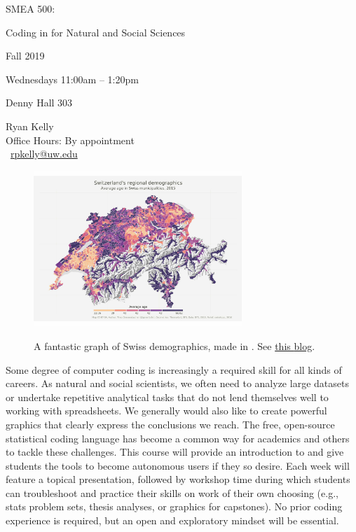 \documentclass[11pt,letterpaper]{article}
\begin{document}
\begin{center} 
 {\titlefont
		
		\Huge
		SMEA 500:
		
		Coding in \R for Natural and Social Sciences}


{\large
Fall 2019
	
Wednesdays 11:00am -- 1:20pm

Denny Hall 303}

{\large
		Ryan Kelly \\
		Office Hours: By appointment\\
		\Letter\ \href{mailto:rpkelly@uw.edu}{rpkelly@uw.edu}}

\end{center}
\setlength{\parskip}{1em}


\begin{figure}[!ht]
\begin{center}
  \includegraphics[width = 0.7\textwidth]{tm-final-map-1.jpg}\par
  {\small A fantastic graph of Swiss demographics, made in \R. See \href{https://blog.revolutionanalytics.com/2016/12/swiss-map.html}{this \underline{blog}}.}
\end{center}
\end{figure}



Some degree of computer coding is increasingly a required skill for all kinds of careers. As natural and social scientists, we often need to analyze large datasets or undertake repetitive analytical tasks that do not lend themselves well to working with spreadsheets. We generally would also like to create powerful graphics that clearly express the conclusions we reach. The free, open-source statistical coding language \R has become a common way for academics and others to tackle these challenges. This course will provide an introduction to \R and give students the tools to become autonomous users if they so desire. Each week will feature a topical presentation, followed by workshop time during which students can troubleshoot and practice their skills on work of their own choosing (e.g., stats problem sets, thesis analyses, or graphics for capstones). No prior coding experience is required, but an open and exploratory mindset will be essential. 
\end{document}
